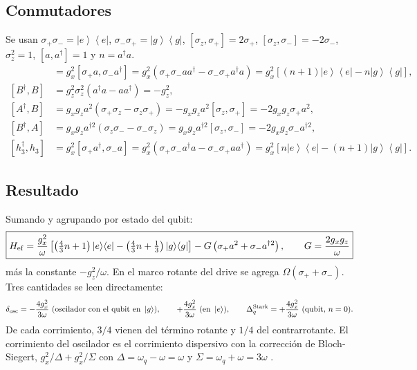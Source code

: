 \documentclass[11pt]{report}
\newcommand{\ket}[1]{\left|#1\right\rangle}
\newcommand{\bra}[1]{\left\langle#1\right|}
\newcommand{\spl}{\sigma_{+}}
\newcommand{\smi}{\sigma_{-}}
\newcommand{\Pe}{\ket{e}\!\bra{e}}
\newcommand{\Pg}{\ket{g}\!\bra{g}}
\begin{document}
\subsection{Conmutadores}

Se usan $\spl\smi=\Pe$, $\smi\spl=\Pg$, $[\sigma_{z},\spl]=2\spl$, $[\sigma_{z},\smi]=-2\smi$, $\sigma_{z}^{2}=1$, $[a,a^{\dagger}]=1$ y $n=a^{\dagger}a$.
\begin{align}
[A^{\dagger},A]&=g_{x}^{2}[\spl a,\smi a^{\dagger}]=g_{x}^{2}(\spl\smi aa^{\dagger}-\smi\spl a^{\dagger}a)=g_{x}^{2}[(n+1)\Pe-n\Pg],\\
[B^{\dagger},B]&=g_{z}^{2}\sigma_{z}^{2}(a^{\dagger}a-aa^{\dagger})=-g_{z}^{2},\\
[A^{\dagger},B]&=g_{x}g_{z}a^{2}(\spl\sigma_{z}-\sigma_{z}\spl)=-g_{x}g_{z}a^{2}[\sigma_{z},\spl]=-2g_{x}g_{z}\spl a^{2},\\
[B^{\dagger},A]&=g_{x}g_{z}a^{\dagger2}(\sigma_{z}\smi-\smi\sigma_{z})=g_{x}g_{z}a^{\dagger2}[\sigma_{z},\smi]=-2g_{x}g_{z}\smi a^{\dagger2},\\
[h_{3}^{\dagger},h_{3}]&=g_{x}^{2}[\spl a^{\dagger},\smi a]=g_{x}^{2}(\spl\smi a^{\dagger}a-\smi\spl aa^{\dagger})=g_{x}^{2}[n\Pe-(n+1)\Pg].
\end{align}

\subsection{Resultado}

Sumando y agrupando por estado del qubit:
\begin{equation}
\boxed{H_{\rm ef}=\frac{g_{x}^{2}}{\omega}\left[\left(\tfrac{4}{3}n+1\right)\Pe-\left(\tfrac{4}{3}n+\tfrac{1}{3}\right)\Pg\right]-G\left(\spl a^{2}+\smi a^{\dagger2}\right),\qquad G=\frac{2g_{x}g_{z}}{\omega}}
\label{eq:Hef}
\end{equation}
m\'as la constante $-g_{z}^{2}/\omega$. En el marco rotante del drive se agrega $\Omega(\spl+\smi)$. Tres cantidades se leen directamente:
\begin{equation}
\delta_{\rm osc}=-\frac{4g_{x}^{2}}{3\omega}\ (\text{oscilador con el qubit en }\ket{g}),\qquad +\frac{4g_{x}^{2}}{3\omega}\ (\text{en }\ket{e}),\qquad \Delta_{q}^{\rm Stark}=+\frac{4g_{x}^{2}}{3\omega}\ (\text{qubit, }n=0).
\end{equation}
De cada corrimiento, $3/4$ vienen del t\'ermino rotante y $1/4$ del contrarrotante. El corrimiento del oscilador es el corrimiento dispersivo con la correcci\'on de Bloch-Siegert, $g_{x}^{2}/\Delta+g_{x}^{2}/\Sigma$ con $\Delta=\omega_{q}-\omega=\omega$ y $\Sigma=\omega_{q}+\omega=3\omega$ \cite{Zueco2009}.
\end{document}
